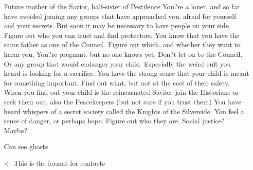 \documentclass[char]{Silversiders}
\begin{document}
\name{\cOutcast{}}

Future mother of the Savior, half-sister of Pestilence
You?re a loner, and so far have avoided joining any groups that have approached you, afraid for yourself and your secrets. But soon it may be necessary to have people on your side. Figure out who you can trust and find protectors.
You know that you have the same father as one of the Council. Figure out which, and whether they want to harm you.
You?re pregnant, but no one knows yet. Don?t let on to the Council. Or any group that would endanger your child. Especially the weird cult you heard is looking for a sacrifice.
You have the strong sense that your child is meant for something important. Find out what, but not at the cost of their safety.
When you find out your child is the reincarnated Savior, join the Historians or seek them out, also the Peacekeepers (but not sure if you trust them)
You have heard whispers of a secret society called the Knights of the Silverside. You feel a sense of danger, or perhaps hope. Figure out who they are.
Social justice? Maybe?

Can see ghosts

\begin{itemz}[Goals]
	\item 
\end{itemz}

\begin{itemz}[Notes]
	\item 
\end{itemz}

\begin{contacts}
	\contact{\cTest{}} <- This is the format for contacts 
\end{contacts}
\end{document}
